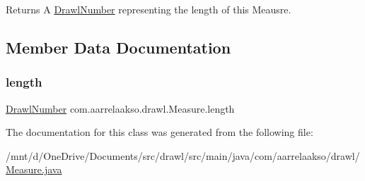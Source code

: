 \begin{DoxyReturn}{Returns}
A \hyperlink{classcom_1_1aarrelaakso_1_1drawl_1_1_drawl_number}{Drawl\+Number} representing the length of this Meausre. 
\end{DoxyReturn}


\subsection{Member Data Documentation}
\mbox{\label{classcom_1_1aarrelaakso_1_1drawl_1_1_measure_a13ac55ae968c5e7bed4b3305370d94c5}} 
\subsubsection{\texorpdfstring{length}{length}}
{\footnotesize\ttfamily \hyperlink{classcom_1_1aarrelaakso_1_1drawl_1_1_drawl_number}{Drawl\+Number} com.\+aarrelaakso.\+drawl.\+Measure.\+length\hspace{0.3cm}{\ttfamily [private]}}



The documentation for this class was generated from the following file\+:\begin{DoxyCompactItemize}
\item 
/mnt/d/\+One\+Drive/\+Documents/src/drawl/src/main/java/com/aarrelaakso/drawl/\hyperlink{_measure_8java}{Measure.\+java}\end{DoxyCompactItemize}
